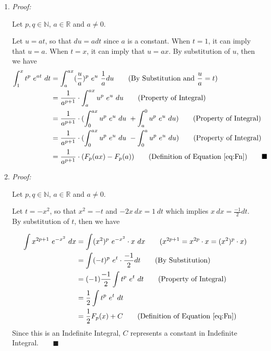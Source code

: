 \documentclass[12pt]{exam}
\newcommand{\vv}{\vspace{.1cm}}
\newcommand{\R}{\mathbb{R}}
\newcommand{\N}{\mathbb{N}}
\begin{document}
\begin{enumerate}
\vv

\begin{enumerate}
    \item \emph{Proof:}
		
		Let $p, q\in\N$, $a\in\R$ and $a \neq 0$.
		
		Let $u=at$, so that $du=adt$ since $a$ is a constant. When $t=1$, it can imply that $u=a$. When $t=x$, it can imply that $u=ax$. By substitution of $u$, then we have
		\begin{align*}
		    \int_1^x t^p\ e^{at}\ dt&=\int_a^{ax} (\frac{u}{a})^p\ e^{u}\ \frac{1}{a}du\qquad(\mbox{By Substitution and }\frac{u}{a}=t)\\
		    &=\frac{1}{a^{p+1}}\cdot\int_a^{ax} u^p\ e^{u}\ du\qquad(\mbox{Property of Integral})\\
		    &=\frac{1}{a^{p+1}}\cdot(\int_0^{ax} u^p\ e^{u}\ du\ +\int_a^{0} u^p\ e^{u}\ du)\qquad(\mbox{Property of Integral})\\
		    &=\frac{1}{a^{p+1}}\cdot(\int_0^{ax} u^p\ e^{u}\ du\ -\int_0^{a} u^p\ e^{u}\ du)\qquad(\mbox{Property of Integral})\\
		    &=\frac{1}{a^{p+1}}\cdot(F_p(ax) - F_p(a))\qquad(\mbox{Definition of Equation \eqref{eq:Fn}})\qquad\blacksquare
		\end{align*}
		
		\newpage
    \item \emph{Proof:}
    
        Let $p, q\in\N$, $a\in\R$ and $a \neq 0$.
        
        Let $t=-x^2$, so that $x^2=-t$ and $-2x\ dx=1\ dt$ which implies $x\ dx=\frac{-1}{2}dt$. By substitution of $t$, then we have
        
        \begin{align*}
            \int x^{2p+1} \ e^{-x^2} \ dx &= \int (x^2)^p \ e^{-x^2}\cdot x\ dx\qquad(x^{2p+1}=x^{2p}\cdot x=(x^2)^p\cdot x)\\
            &=\int (-t)^p \ e^t\cdot \frac{-1}{2}dt\qquad(\mbox{By Substitution})\\
            &=(-1)\frac{-1}{2}\int t^p \ e^t\ dt\qquad(\mbox{Property of Integral})\\
            &=\frac{1}{2}\int t^p \ e^t\ dt\\
            &=\frac{1}{2}F_p(x)+C\qquad(\mbox{Definition of Equation \eqref{eq:Fn}})
        \end{align*}
        Since this is an Indefinite Integral, $C$ represents a constant in Indefinite Integral.$\qquad\blacksquare$
        

\end{enumerate}
\end{enumerate}
\end{document}
